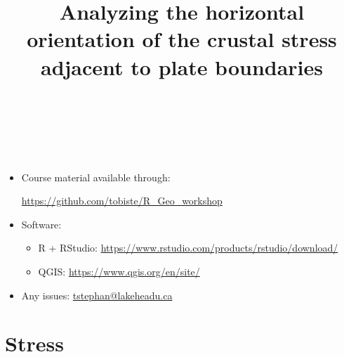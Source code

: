 \documentclass[10pt,xcolor=dvipsnames, aspectratio=169]{beamer}
\author{\textcolor{white}{Tobias Stephan}}
\date{\textcolor{white}{09/10/2023}}
\title[Analysing stress orientation]{Analyzing the horizontal orientation of the crustal stress adjacent to plate boundaries}
\institute[LakeheadU]{\textcolor{white}{Lakehead University, Thunder Bay, ON}}
\begin{document}
  
{
\begin{frame}[plain]
    \titlepage
  \end{frame}
}

\begin{frame}
\begin{itemize}
  \item Course material available through:\\
  \begin{center}
    \url{https://github.com/tobiste/R_Geo_workshop}
  \end{center}
  \item Software:
    \begin{itemize}
      \item  R + RStudio: \url{https://www.rstudio.com/products/rstudio/download/}
      \item QGIS: \url{https://www.qgis.org/en/site/}
    \end{itemize}
  \item Any issues: \href{mailto:tstephan@lakeheadu.ca}{tstephan@lakeheadu.ca}
\end{itemize}

   
\end{frame}

\section{Stress}
\end{document}
